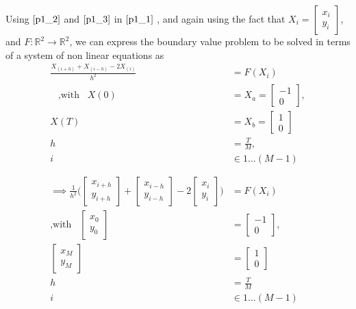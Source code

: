 \documentclass[twoside,12pt]{article}
\begin{document}
Using $\eqref{p1_2}$ and  $\eqref{p1_3}$ in $\eqref{p1_1}$ , and again using the fact that $X_i= \begin{bmatrix}x_i\\y_i\end{bmatrix}$, and $F\colon \mathbb{R}^2\to\mathbb{R}^2$,  we can express the boundary value problem to be solved in terms of a system of non linear equations as
\begin{align*}
\frac{X_{(i+h)}+X_{(i-h)}-2X_{(i)}}{h^2} &= F(X_i)\\
\;\;\;\text{,with}\;\;\;X(0)&=X_a=\begin{bmatrix}-1\\0\end{bmatrix},\\
X(T)&=X_b=\begin{bmatrix}1\\0\end{bmatrix}\\
h &= \frac{T}{M},\\
i &\in 1\dots(M-1)\\
\\\\
\implies \frac{1}{h^2}\bigg(\begin{bmatrix}x_{i+h}\\y_{i+h}\end{bmatrix}+\begin{bmatrix}x_{i-h}\\y_{i-h}\end{bmatrix}-2\begin{bmatrix}x_{i}\\y_{i}\end{bmatrix}\bigg) &= F(X_i)\\
\text{,with}\;\;\;\begin{bmatrix}x_{0}\\y_{0}\end{bmatrix}&=\begin{bmatrix}-1\\0\end{bmatrix},\\
\begin{bmatrix}x_{M}\\y_{M}\end{bmatrix}&=\begin{bmatrix}1\\0\end{bmatrix}\\
h &= \frac{T}{M}\\
i &\in 1\dots(M-1)\\

\end{align*}
\end{document}
